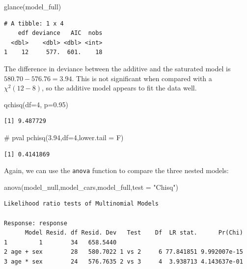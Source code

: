 \documentclass[
  letterpaper,
  DIV=11,
  numbers=noendperiod]{scrartcl}
\newenvironment{Shaded}{\begin{snugshade}}{\end{snugshade}}
\newcommand{\AttributeTok}[1]{\textcolor[rgb]{0.40,0.45,0.13}{#1}}
\newcommand{\CommentTok}[1]{\textcolor[rgb]{0.37,0.37,0.37}{#1}}
\newcommand{\DecValTok}[1]{\textcolor[rgb]{0.68,0.00,0.00}{#1}}
\newcommand{\FloatTok}[1]{\textcolor[rgb]{0.68,0.00,0.00}{#1}}
\newcommand{\FunctionTok}[1]{\textcolor[rgb]{0.28,0.35,0.67}{#1}}
\newcommand{\NormalTok}[1]{\textcolor[rgb]{0.00,0.23,0.31}{#1}}
\newcommand{\StringTok}[1]{\textcolor[rgb]{0.13,0.47,0.30}{#1}}
\begin{document}
\begin{Shaded}
\begin{Highlighting}[]
\FunctionTok{glance}\NormalTok{(model\_full)}
\end{Highlighting}
\end{Shaded}

\begin{verbatim}
# A tibble: 1 x 4
    edf deviance   AIC  nobs
  <dbl>    <dbl> <dbl> <int>
1    12     577.  601.    18
\end{verbatim}

The difference in deviance between the additive and the saturated model
is \(580.70-576.76=3.94\). This is not significant when compared with a
\(\chi^2(12-8)\), so the additive model appears to fit the data well.

\begin{Shaded}
\begin{Highlighting}[]
\FunctionTok{qchisq}\NormalTok{(}\AttributeTok{df=}\DecValTok{4}\NormalTok{, }\AttributeTok{p=}\FloatTok{0.95}\NormalTok{)}
\end{Highlighting}
\end{Shaded}

\begin{verbatim}
[1] 9.487729
\end{verbatim}

\begin{Shaded}
\begin{Highlighting}[]
\CommentTok{\# pval}
\FunctionTok{pchisq}\NormalTok{(}\FloatTok{3.94}\NormalTok{,}\AttributeTok{df=}\DecValTok{4}\NormalTok{,}\AttributeTok{lower.tail =}\NormalTok{ F)}
\end{Highlighting}
\end{Shaded}

\begin{verbatim}
[1] 0.4141869
\end{verbatim}

Again, we can use the \texttt{anova} function to compare the three
nested models:

\begin{Shaded}
\begin{Highlighting}[]
\FunctionTok{anova}\NormalTok{(model\_null,model\_cars,model\_full,}\AttributeTok{test =} \StringTok{"Chisq"}\NormalTok{) }
\end{Highlighting}
\end{Shaded}

\begin{verbatim}
Likelihood ratio tests of Multinomial Models

Response: response
      Model Resid. df Resid. Dev   Test    Df  LR stat.      Pr(Chi)
1         1        34   658.5440                                    
2 age + sex        28   580.7022 1 vs 2     6 77.841851 9.992007e-15
3 age * sex        24   576.7635 2 vs 3     4  3.938713 4.143637e-01
\end{verbatim}
\end{document}
